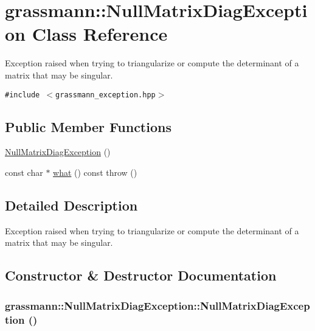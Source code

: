 \hypertarget{classgrassmann_1_1NullMatrixDiagException}{
\section{grassmann::NullMatrixDiagException Class Reference}
\label{classgrassmann_1_1NullMatrixDiagException}
}
Exception raised when trying to triangularize or compute the determinant of a matrix that may be singular.  


{\tt \#include $<$grassmann\_\-exception.hpp$>$}

\subsection*{Public Member Functions}
\begin{CompactItemize}
\item 
\hyperlink{classgrassmann_1_1NullMatrixDiagException_866b2dd493e68da4cbbd893ade2f94fd}{NullMatrixDiagException} ()
\item 
const char $\ast$ \hyperlink{classgrassmann_1_1NullMatrixDiagException_77aa3ba59a7e6e78204e5216f459b167}{what} () const   throw ()
\end{CompactItemize}


\subsection{Detailed Description}
Exception raised when trying to triangularize or compute the determinant of a matrix that may be singular. 

\subsection{Constructor \& Destructor Documentation}
\hypertarget{classgrassmann_1_1NullMatrixDiagException_866b2dd493e68da4cbbd893ade2f94fd}{
\subsubsection[NullMatrixDiagException]{\setlength{\rightskip}{0pt plus 5cm}grassmann::NullMatrixDiagException::NullMatrixDiagException ()}}
\label{classgrassmann_1_1NullMatrixDiagException_866b2dd493e68da4cbbd893ade2f94fd}




